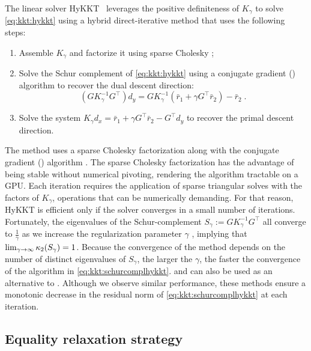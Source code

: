 The linear solver HyKKT~\cite{regev2023hykkt}
leverages the positive definiteness of $K_\gamma$ to solve
\eqref{eq:kkt:hykkt} using a hybrid direct-iterative method
that uses the following steps:
\begin{enumerate}
  \item Assemble $K_\gamma$ and factorize it using sparse Cholesky ;
  \item Solve the Schur complement of \eqref{eq:kkt:hykkt} using a conjugate gradient (\CG)
    algorithm to recover the dual descent direction:
    \begin{equation}
      \label{eq:kkt:schurcomplhykkt}
      (G K_\gamma^{-1} G^\top) d_y = G K_\gamma^{-1} (\bar{r}_1 + \gamma G^\top \bar{r}_2) - \bar{r}_2 \; .
    \end{equation}
  \item Solve the system $K_\gamma d_x = \bar{r}_1 + \gamma G^\top \bar{r}_2 - G^\top d_y$
    to recover the primal descent direction.
\end{enumerate}
The method uses a sparse Cholesky factorization along with the conjugate gradient (\CG) algorithm \cite{hestenes-stiefel-1952}.
The sparse Cholesky factorization has the advantage of being stable without
numerical pivoting, rendering the algorithm tractable on a GPU.
Each \CG iteration requires the application of sparse triangular solves with the
factors of $K_\gamma$, operations that can be numerically demanding. For that reason,
HyKKT is efficient only if the \CG solver converges in a small number of iterations.
Fortunately, the eigenvalues of the Schur-complement $S_\gamma := G K_\gamma^{-1} G^\top$
all converge to $\frac{1}{\gamma}$ as we increase the regularization parameter
$\gamma$ \cite[Theorem 4]{regev2023hykkt}, implying that $\lim_{\gamma \to \infty} \kappa_2(S_\gamma) = 1$.
Because the convergence of the \CG method depends on the number of distinct eigenvalues of $S_{\gamma}$,
the larger the $\gamma$, the faster the convergence of
the \CG algorithm in \eqref{eq:kkt:schurcomplhykkt}.
\CR \cite{hestenes-stiefel-1952} and \CAR \cite{montoison-orban-saunders-2023} can also be used as an alternative to \CG.
Although we observe similar performance, these methods ensure a monotonic decrease in the residual norm of \eqref{eq:kkt:schurcomplhykkt} at each iteration.

\subsection{Equality relaxation strategy}
\label{sec:kkt:sckkt}

